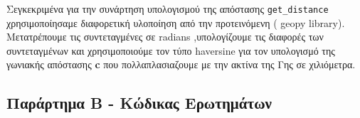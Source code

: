 \documentclass{article}
\begin{document}
Σεγκεκριμένα για την συνάρτηση υπολογισμού της απόστασης  \texttt{get\_distance}  χρησιμοποίησαμε διαφορετική υλοποίηση από την προτεινόμενη ( geopy library). Μετατρέπουμε τις συντεταγμένες σε  radians ,υπολογίζουμε τις διαφορές των συντεταγμένων και χρησιμοποιούμε τον τύπο  haversine  για τον υπολογισμό της γωνιακής απόστασης \textbf{c} που πολλαπλασιαζουμε με την ακτίνα της Γης σε χιλιόμετρα.


\subsection*{Παράρτημα B - Kώδικας Ερωτημάτων}
\label{subsec:apend_B}
\end{document}
